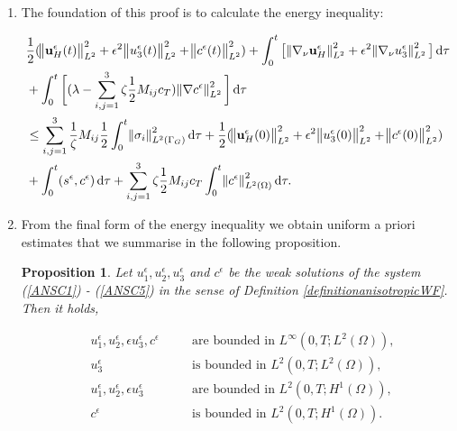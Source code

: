 \documentclass[11pt]{article}
\newtheorem{prop}{Proposition}
\newcommand*\diff{\mathop{}\!\mathrm{d}}
\begin{document}
\begin{enumerate}

  \item The foundation of this proof is to calculate the energy inequality:
  
  \begin{equation}
    \begin{split}  
    & \frac{1}{2} (\norm{\mathbf{u}_H^\epsilon (t)}_{L^2}^2 + \epsilon ^ 2 \norm{u_3^\epsilon (t)}_{L^2}^2 + \norm{c^\epsilon (t)}_{L^2}^2) + \int_0 ^ t \big [\norm{\nabla_\nu \mathbf{u}_H^\epsilon}_{L^2}^2 + \epsilon ^ 2 \norm{\nabla_\nu u_3^\epsilon}_{L^2}^2 \big ] \diff \tau \\
    & + \int_0 ^ t \bigg[ (\lambda - \sum_{i,j = 1}^3 \zeta \frac{1}{2} M_{ij} c_T) \norm{\nabla c^\epsilon}_{L^2}^2  \bigg] \diff \tau \\
    & \leq \sum_{i,j = 1}^3 \frac{1}{\zeta} M_{ij} \frac{1}{2} \int_0 ^ t \norm{\sigma_i}^2 _{L^2 (\Gamma_G)} \diff \tau + \frac{1}{2} (\norm{\mathbf{u}_H^\epsilon (0)}_{L^2}^2 + \epsilon ^ 2 \norm{u_3^\epsilon (0)}_{L^2}^2 + \norm{c^\epsilon (0)}_{L^2}^2) \\
    & + \int_0^t (s^\epsilon,c^\epsilon) \diff \tau + \sum_{i,j = 1}^3 \zeta \frac{1}{2} M_{ij} c_T  \int_0 ^ t \norm{c^\epsilon}^2 _{L^2 (\Omega) } \diff \tau. \raisetag{90pt} \label{finalformEIEQ}
    \end{split}
  \end{equation}
  
  \item From the final form of the energy inequality we obtain uniform a priori estimates that we summarise in the following proposition.
  
\begin{prop}
  Let $u^\epsilon_1, u^\epsilon_2, u^\epsilon_3$ and $c^\epsilon$ be the weak solutions of the system (\ref{ANSC1}) - (\ref{ANSC5}) in the sense of Definition \ref{definitionanisotropicWF}. Then it holds,
    
  \begin{align}
    & u^\epsilon_1, u^\epsilon_2, \epsilon u^\epsilon_3, c^\epsilon & \quad & \text{are bounded in $L^\infty (0,T; L^2(\Omega)),$} \label{proposition1} \\
    & u^\epsilon_3 & \quad & \text{is bounded in $L^2 (0,T; L^2(\Omega)),$} \label{propositionExtra} \\
    & u^\epsilon_1, u^\epsilon_2, \epsilon u^\epsilon_3 & \quad & \text{are bounded in $L^2(0,T; H^1(\Omega)),$} \label{proposition2} \\
    & c^\epsilon & \quad & \text{is bounded in $L^2(0,T;H^1(\Omega)).$} \label{proposition3}
  \end{align}
\end{prop}
  

\end{enumerate}
\end{document}
